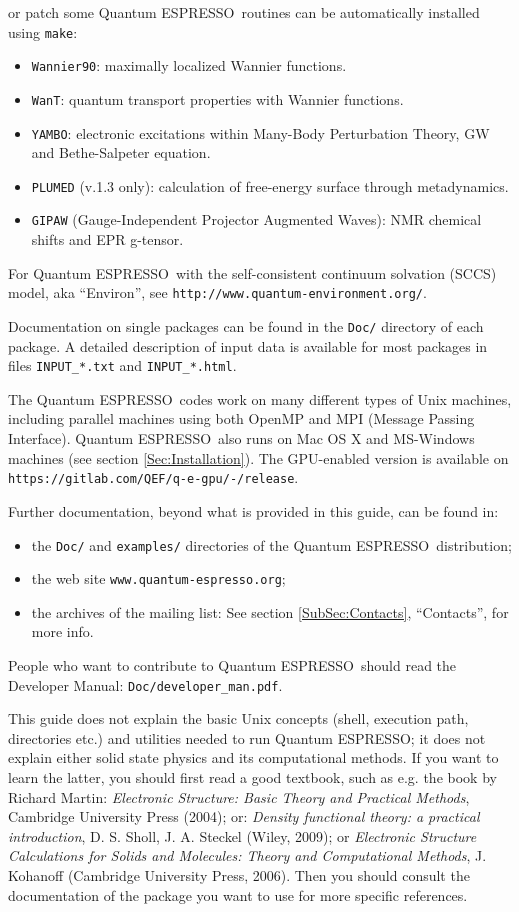 \documentclass[12pt,a4paper]{article}
\def\qe{{\sc Quantum ESPRESSO}}
\begin{document}
or patch some \qe\ routines can be automatically installed using
\texttt{make}:
\begin{itemize}
\item \texttt{Wannier90}:
      maximally localized Wannier functions.
\item \texttt{WanT}:
      quantum transport properties with Wannier functions.
\item \texttt{YAMBO}:
      electronic excitations within Many-Body Perturbation Theory,
      GW and Bethe-Salpeter equation.
\item \texttt{PLUMED} (v.1.3 only):
      calculation of free-energy surface through metadynamics.
\item \texttt{GIPAW} (Gauge-Independent Projector Augmented Waves):
      NMR chemical shifts and EPR g-tensor.
\end{itemize}
For \qe\ with the self-consistent continuum solvation (SCCS) model,
aka ``Environ'', see \texttt{http://www.quantum-environment.org/}.

Documentation on single packages can be found in the \texttt{Doc/}
directory of each package. A detailed description of input
data is available for most packages in files \texttt{INPUT\_*.txt} and
\texttt{INPUT\_*.html}.

The \qe\ codes work on many different types of Unix machines,
including parallel machines using both OpenMP and MPI
(Message Passing Interface).
\qe\ also runs on Mac OS X and MS-Windows machines
(see section \ref{Sec:Installation}). The GPU-enabled version is
available on \texttt{https://gitlab.com/QEF/q-e-gpu/-/release}.

Further documentation, beyond what is provided in this guide, can be found in:
\begin{itemize}
\item the \texttt{Doc/} and \texttt{examples/} directories
  of the \qe\ distribution;
  \item the web site \texttt{www.quantum-espresso.org};
  \item the archives of the  mailing list:
   See section \ref{SubSec:Contacts}, ``Contacts'', for more info.
\end{itemize}
People who want to contribute to \qe\ should read the
Developer Manual: \texttt{Doc/developer\_man.pdf}.

This guide does not explain the basic Unix concepts (shell, execution
path, directories etc.) and utilities needed to run \qe; it does not
explain either solid state physics and its computational methods.
If you want to learn the latter, you should first read a good textbook,
such as e.g. the book by Richard Martin:
{\em Electronic Structure: Basic Theory and Practical Methods},
Cambridge University Press (2004); or:
{\em Density functional theory: a practical introduction},
D. S. Sholl, J. A. Steckel (Wiley, 2009); or
{\em Electronic Structure Calculations for Solids and Molecules:
Theory and Computational Methods},
J. Kohanoff (Cambridge University Press, 2006). Then you should consult
the documentation of the package you want to use for more specific references.
\end{document}
